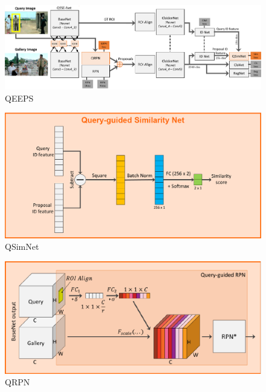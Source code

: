 \begin{figure}[h!]
    \centering
    \includegraphics[width=.9\linewidth]{images/qeeps}
    \caption[QEEPS]{QEEPS}
    \label{fig:qeeps}
\end{figure}
\begin{minipage}{.35\textwidth}
    \begin{figure}[H]
        \centering
        \includegraphics[width=.95\linewidth]{images/qsimnet}
        \caption[QSimNet]{QSimNet}
        \label{fig:qsimnet}
    \end{figure}
\end{minipage}
\begin{minipage}{.39\textwidth}
    \begin{figure}[H]
        \centering
        \includegraphics[width=.95\linewidth]{images/qrpn}
        \caption[QRPN]{QRPN}
        \label{fig:qrpn}
    \end{figure}
\end{minipage}
